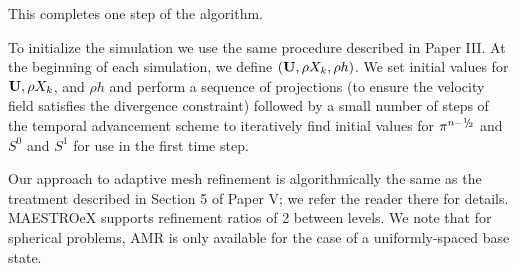 This completes one step of the algorithm.

To initialize the simulation we use the same procedure described in Paper III.
At the beginning of each simulation, we define $({\bf{U}},\rho X_k,\rho h)$.
We set initial values for ${\bf{U}}, \rho X_k$, and $\rho h$ and perform a sequence of projections 
(to ensure the velocity field satisfies the divergence constraint) 
followed by a small number of steps of the temporal advancement scheme to iteratively 
find initial values for $\pi^{n-\myhalf}$ and $S^0$ and $S^1$ for use in the first time step.

Our approach to adaptive mesh refinement is algorithmically the same as the treatment described 
in Section 5 of Paper V; we refer the reader there for details.
MAESTROeX supports refinement ratios of 2 between levels.
We note that for spherical problems, AMR is only available for the case of a uniformly-spaced base state.
